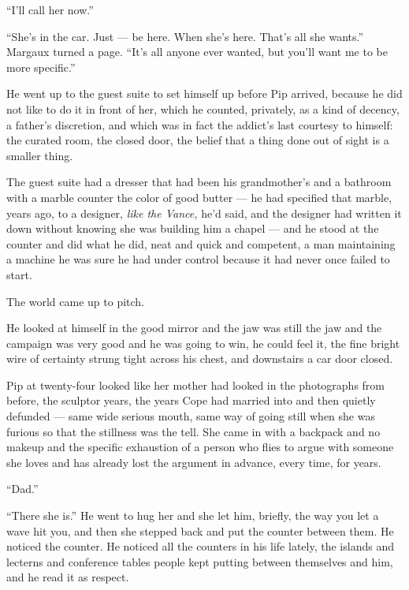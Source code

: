 \documentclass[11pt,openany]{book}
\newcommand{\scenebreak}{\par\vspace{0.5\baselineskip}\begin{center}\textasteriskcentered\quad\textasteriskcentered\quad\textasteriskcentered\end{center}\vspace{0.5\baselineskip}\par}
\begin{document}
``I'll call her now.''

``She's in the car. Just --- be here. When she's here. That's all she wants.'' Margaux turned a page. ``It's all anyone ever wanted, but you'll want me to be more specific.''


\scenebreak


He went up to the guest suite to set himself up before Pip arrived, because he did not like to do it in front of her, which he counted, privately, as a kind of decency, a father's discretion, and which was in fact the addict's last courtesy to himself: the curated room, the closed door, the belief that a thing done out of sight is a smaller thing.

The guest suite had a dresser that had been his grandmother's and a bathroom with a marble counter the color of good butter --- he had specified that marble, years ago, to a designer, \textit{like the Vance,} he'd said, and the designer had written it down without knowing she was building him a chapel --- and he stood at the counter and did what he did, neat and quick and competent, a man maintaining a machine he was sure he had under control because it had never once failed to start.

The world came up to pitch.

He looked at himself in the good mirror and the jaw was still the jaw and the campaign was very good and he was going to win, he could feel it, the fine bright wire of certainty strung tight across his chest, and downstairs a car door closed.


\scenebreak


Pip at twenty-four looked like her mother had looked in the photographs from before, the sculptor years, the years Cope had married into and then quietly defunded --- same wide serious mouth, same way of going still when she was furious so that the stillness was the tell. She came in with a backpack and no makeup and the specific exhaustion of a person who flies to argue with someone she loves and has already lost the argument in advance, every time, for years.

``Dad.''

``There she is.'' He went to hug her and she let him, briefly, the way you let a wave hit you, and then she stepped back and put the counter between them. He noticed the counter. He noticed all the counters in his life lately, the islands and lecterns and conference tables people kept putting between themselves and him, and he read it as respect.
\end{document}
